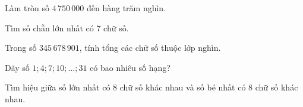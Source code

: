 \begin{ex} %
Làm tròn số $4\,750\,000$ đến hàng trăm nghìn.
\end{ex}

\begin{ex} %
Tìm số chẵn lớn nhất có 7 chữ số.
\end{ex}

\begin{ex} %
Trong số $345\,678\,901$, tính tổng các chữ số thuộc lớp nghìn.
\end{ex}

\begin{ex} %
Dãy số $1; 4; 7; 10; \dots; 31$ có bao nhiêu số hạng?
\end{ex}

\begin{ex} %
Tìm hiệu giữa số lớn nhất có 8 chữ số khác nhau và số bé nhất có 8 chữ số khác nhau.
\end{ex}
